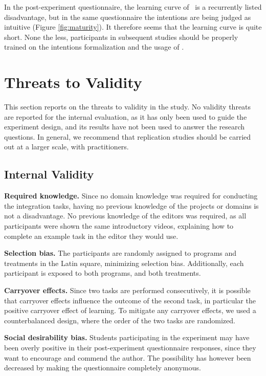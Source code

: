 In the post-experiment questionnaire, the learning curve of \tooln~is a recurrently listed disadvantage, but in the same questionnaire the intentions are being judged as intuitive (Figure \ref{fig:maturity}). It therefore seems that the learning curve is quite short. None the less, participants in subsequent studies should be properly trained on the intentions formalization and the usage of \tooln.

\section{Threats to Validity}
This section reports on the threats to validity in the study. No validity threats are reported for the internal evaluation, as it has only been used to guide the experiment design, and its results have not been used to answer the research questions. In general, we recommend that replication studies should be carried out at a larger scale, with practitioners. 

\subsection{Internal Validity}
\textbf{Required knowledge.} 
Since no domain knowledge was required for conducting the integration tasks, having no previous knowledge of the projects or domains is not a disadvantage. No previous knowledge of the editors was required, as all participants were shown the same introductory videos, explaining how to complete an example task in the editor they would use.

\textbf{Selection bias.} The participants are randomly assigned to programs and treatments in the Latin square, minimizing selection bias. Additionally, each participant is exposed to both programs, and both treatments.

\textbf{Carryover effects.} Since two tasks are performed consecutively, it is possible that carryover effects influence the outcome of the second task, in particular the positive carryover effect of learning. To mitigate any carryover effects, we used a counterbalanced design, where the order of the two tasks are randomized.

\textbf{Social desirability bias.} Students participating in the experiment may have been overly positive in their post-experiment questionnaire responses, since they want to encourage and commend the author. The possibility has however been decreased by making the questionnaire completely anonymous.

